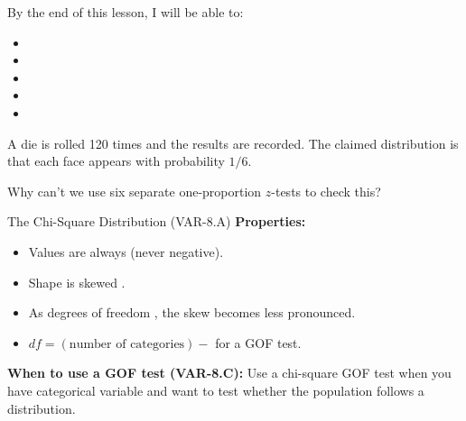 \documentclass[10pt]{article}
\begin{document}
\namedateperiod

\begin{objectivebox}
By the end of this lesson, I will be able to:
\begin{itemize}
    \item[$\square$] \writeline
    \item[$\square$] \writeline
    \item[$\square$] \writeline
    \item[$\square$] \writeline
    \item[$\square$] \writeline
\end{itemize}
\end{objectivebox}

\begin{vocabbox}
\end{vocabbox}

\begin{hookbox}
A die is rolled 120 times and the results are recorded. The claimed distribution is
that each face appears with probability $1/6$.

Why can't we use six separate one-proportion $z$-tests to check this? 
\end{hookbox}

\begin{notesbox}{The Chi-Square Distribution (VAR-8.A)}
\textbf{Properties:}
\begin{itemize}
    \item Values are always \blank{4cm} (never negative).
    \item Shape is skewed \blank{3cm}.
    \item As degrees of freedom \blank{4cm}, the skew becomes less pronounced.
    \item $df = (\text{number of categories}) - $ \blank{1cm} for a GOF test.
\end{itemize}

\vspace{0.1in}
\textbf{When to use a GOF test (VAR-8.C):} Use a chi-square GOF test when you have
\blank{3cm} categorical variable and want to test whether the population follows
a \blank{5cm} distribution.
\end{notesbox}
\end{document}
